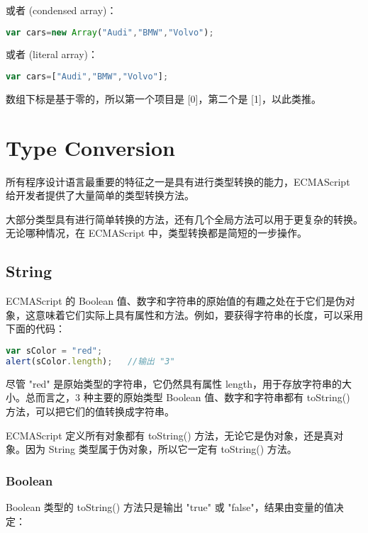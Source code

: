或者 (condensed array)：


\begin{lstlisting}[language=JavaScript]
var cars=new Array("Audi","BMW","Volvo");
\end{lstlisting}

或者 (literal array)：

\begin{lstlisting}[language=JavaScript]
var cars=["Audi","BMW","Volvo"];
\end{lstlisting}

数组下标是基于零的，所以第一个项目是 [0]，第二个是 [1]，以此类推。


\chapter{Type Conversion}

所有程序设计语言最重要的特征之一是具有进行类型转换的能力，ECMAScript 给开发者提供了大量简单的类型转换方法。

大部分类型具有进行简单转换的方法，还有几个全局方法可以用于更复杂的转换。无论哪种情况，在 ECMAScript 中，类型转换都是简短的一步操作。


\section{String}

ECMAScript 的 Boolean 值、数字和字符串的原始值的有趣之处在于它们是伪对象，这意味着它们实际上具有属性和方法。例如，要获得字符串的长度，可以采用下面的代码：

\begin{lstlisting}[language=JavaScript]
var sColor = "red";
alert(sColor.length);	//输出 "3"
\end{lstlisting}


尽管 "red" 是原始类型的字符串，它仍然具有属性 length，用于存放字符串的大小。总而言之，3 种主要的原始类型 Boolean 值、数字和字符串都有 toString() 方法，可以把它们的值转换成字符串。

ECMAScript 定义所有对象都有 toString() 方法，无论它是伪对象，还是真对象。因为 String 类型属于伪对象，所以它一定有 toString() 方法。


\subsection{Boolean}


Boolean 类型的 toString() 方法只是输出 "true" 或 "false"，结果由变量的值决定：



